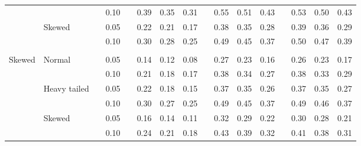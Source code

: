 \documentclass{article} %
\begin{document}
\begin{table}[ht]
\begin{scriptsize}
\begin{center}
\begin{tabular}{ll p{.1cm} c p{.1cm} rrr p{.1cm} rrr p{.1cm} rrr}
             &              && 0.10 &&   0.39 & 0.35 & 0.31 && 0.55 & 0.51 & 0.43 &&  0.53 & 0.50 & 0.43 \\
             & Skewed       && 0.05 &&   0.22 & 0.21 & 0.17 && 0.38 & 0.35 & 0.28 &&  0.39 & 0.36 & 0.29 \\
             &              && 0.10 &&   0.30 & 0.28 & 0.25 && 0.49 & 0.45 & 0.37 &&  0.50 & 0.47 & 0.39 \\
             &&&&&&&&&&&&&&&\\
Skewed       & Normal       && 0.05 &&   0.14 & 0.12 & 0.08 && 0.27 & 0.23 & 0.16 &&  0.26 & 0.23 & 0.17 \\
             &              && 0.10 &&   0.21 & 0.18 & 0.17 && 0.38 & 0.34 & 0.27 &&  0.38 & 0.33 & 0.29 \\
             & Heavy tailed && 0.05 &&   0.22 & 0.18 & 0.15 && 0.37 & 0.35 & 0.26 &&  0.37 & 0.35 & 0.27 \\
             &              && 0.10 &&   0.30 & 0.27 & 0.25 && 0.49 & 0.45 & 0.37 &&  0.49 & 0.46 & 0.37 \\
             & Skewed       && 0.05 &&   0.16 & 0.14 & 0.11 && 0.32 & 0.29 & 0.22 &&  0.30 & 0.28 & 0.21 \\
             &              && 0.10 &&   0.24 & 0.21 & 0.18 && 0.43 & 0.39 & 0.32 &&  0.41 & 0.38 & 0.31 \\



\end{tabular}
\end{center}
\end{scriptsize}
\end{table}
\end{document}
